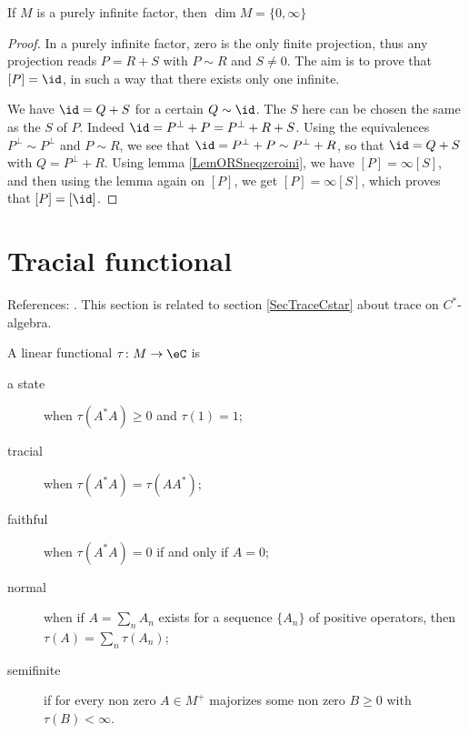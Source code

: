 \begin{corollary}
If $M$ is a purely infinite factor, then $\dim M=\{ 0,\infty \}$
\end{corollary}

\begin{proof}
In a purely infinite factor, zero is the only finite projection, thus any projection reads $P=R+S$ with $P\sim R$ and $S\neq 0$. The aim is to prove that $[P]=\id$, in such a way that there exists only one infinite.

We have $\id=Q+S$ for a certain $Q\sim \id$. The $S$ here can be chosen the same as the $S$ of $P$. Indeed $\id=P^{\perp}+P=P^{\perp}+R+S$. Using the equivalences $P^{\perp}\sim P^{\perp}$ and $P\sim R$, we see that $\id=P^{\perp}+P\sim P^{\perp}+R$, so that $\id=Q+S$ with $Q=P^{\perp}+R$. Using lemma \ref{LemORSneqzeroini}, we have $[P]=\infty[S]$, and then using the lemma again on $[P]$, we get $[P]=\infty[S]$, which proves that $[P]=[\id]$.
\end{proof}

					\section{Tracial functional}
\label{SecTracevonNeuman}

References: \cite{TrioloSemifinite,DixmierTrace}. This section is related to section \ref{SecTraceCstar} about trace on $C^*$-algebra.

A linear functional $\tau\colon M\to \eC$ is
\begin{description}
	\item[a state] when $\tau(A^*A)\geq0$ and $\tau(1)=1$;
	\item[tracial] when $\tau(A^*A)=\tau(AA^*)$;
	\item[faithful] when $\tau(A^*A)=0$ if and only if $A=0$;
	\item[normal] when if $A=\sum_n A_n$ exists for a sequence $\{ A_n \}$ of positive operators, then $\tau(A)=\sum_n\tau(A_n)$;
	\item[semifinite] if for every non zero $A\in M^+$ majorizes some non zero $B\geq 0$ with $\tau(B)<\infty$.
\end{description}

